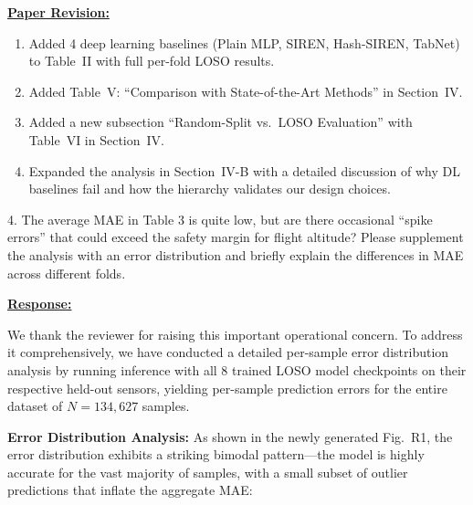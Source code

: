 \vspace{0.1cm}
\noindent
\underline{\textbf{Paper Revision:}}

\begin{enumerate}
    \item Added 4 deep learning baselines (Plain MLP, SIREN, Hash-SIREN, TabNet) to Table~II with full per-fold LOSO results.
    \item Added Table~V: ``Comparison with State-of-the-Art Methods'' in Section~IV.
    \item Added a new subsection ``Random-Split vs.\ LOSO Evaluation'' with Table~VI in Section~IV.
    \item Expanded the analysis in Section~IV-B with a detailed discussion of why DL baselines fail and how the hierarchy validates our design choices.
\end{enumerate}

\newpage

\begin{cmtone}{}{}
4. The average MAE in Table 3 is quite low, but are there occasional ``spike errors'' that could exceed the safety margin for flight altitude? Please supplement the analysis with an error distribution and briefly explain the differences in MAE across different folds.

\end{cmtone}
\vspace{0.1cm}
\noindent
\underline{\textbf{Response:}}
\vspace{0.2cm}

We thank the reviewer for raising this important operational concern. To address it comprehensively, we have conducted a detailed per-sample error distribution analysis by running inference with all 8 trained LOSO model checkpoints on their respective held-out sensors, yielding per-sample prediction errors for the entire dataset of $N = 134{,}627$ samples.

\textbf{Error Distribution Analysis:}
As shown in the newly generated Fig.~R1, the error distribution exhibits a striking bimodal pattern---the model is highly accurate for the vast majority of samples, with a small subset of outlier predictions that inflate the aggregate MAE:

